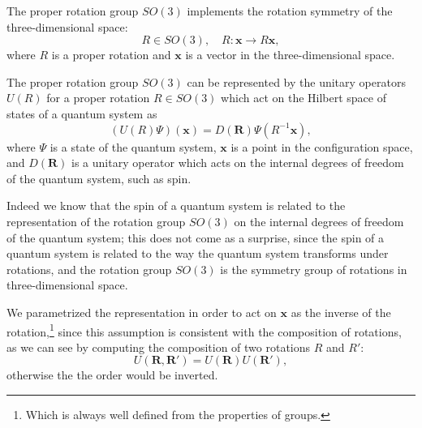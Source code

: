 \begin{example}

    The proper rotation group \(SO(3)\) implements the rotation symmetry of the three-dimensional space:
    \[
        R \in SO(3), \quad R: \mathbf{x} \to R\mathbf{x},
    \]
    where \(R\) is a proper rotation and \(\mathbf{x}\) is a vector in the three-dimensional space.

    The proper rotation group \(SO(3)\) can be represented by the unitary operators \(U(R)\) for a proper rotation \(R \in SO(3)\) which act on the Hilbert space of states of a quantum system as
    \[
        (U(R)\Psi)(\mathbf{x}) = D(\mathbf{R})\Psi(R^{-1}\mathbf{x}),
    \]
    where \(\Psi\) is a state of the quantum system, \(\mathbf{x}\) is a point in the configuration space, and \(D(\mathbf{R})\) is a unitary operator which acts on the internal degrees of freedom of the quantum system, such as spin.

    Indeed we know that the spin of a quantum system is related to the representation of the rotation group \(SO(3)\) on the internal degrees of freedom of the quantum system; this does not come as a surprise, since the spin of a quantum system is related to the way the quantum system transforms under rotations, and the rotation group \(SO(3)\) is the symmetry group of rotations in three-dimensional space.

    We parametrized the representation in order to act on \(\mathbf{x}\) as the inverse of the rotation,\footnote{Which is always well defined from the properties of groups.} since this assumption is consistent with the composition of rotations, as we can see by computing the composition of two rotations \(R\) and \(R'\):
    \[
        U(\mathbf{R},\mathbf{R}') = U(\mathbf{R}) U(\mathbf{R}'),
    \]
    otherwise the the order would be inverted.


\end{example}
